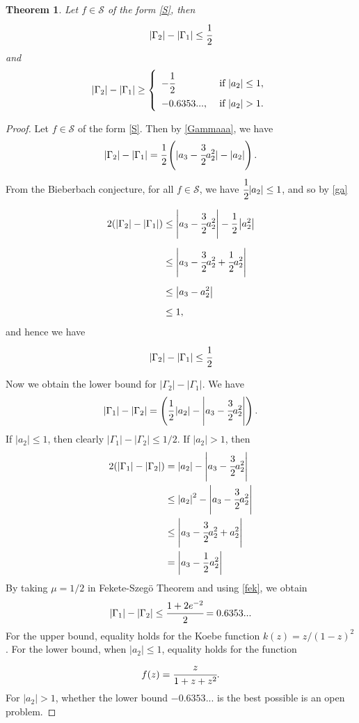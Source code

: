 \documentclass[10pt,a4paper]{amsart}
\newtheorem{theorem}{Theorem}
\begin{document}
 \begin{theorem}\label{classS}
 Let $f \in \mathcal{S}$ of the form \eqref{S}, then 
 $$
 |\Gamma_2|-|\Gamma_1| \leq \cfrac{1}{2}
 $$
 and 
 \begin{equation*}\label{BBB}
|\Gamma_2|-|\Gamma_1| \geq \left \{
	\begin{array}{ll}
		-\cfrac{1}{2} & {\mbox{ if }} |a_2|\leq 1,
		\\[3mm]
		-0.6353..., & {\mbox{ if }} |a_2|>1.
	\end{array}
	\right.
\end{equation*}
 \end{theorem}

 \begin{proof}
 Let $f \in \mathcal{S}$ of the form \eqref{S}. Then by \eqref{Gammaaa}, we have
\begin{equation}\label{ga}
|\Gamma_2|-|\Gamma_1|=\cfrac{1}{2}\left(|a_3-\cfrac{3}{2}a_2^2|-|a_2|\right).
\end{equation}
From the Bieberbach conjecture, for all $f \in \mathcal{S}$, we have $\cfrac{1}{2}|a_2| \leq 1$, and so by \eqref{ga}

\begin{equation}
\begin{aligned}
2(|\Gamma_2|-|\Gamma_1|)&\leq \left|a_3-\cfrac{3}{2}a_2^2\right|-\cfrac{1}{2}\left|a_2^2\right|\\[2mm]
&\leq \left| a_3-\cfrac{3}{2}a_2^2+\cfrac{1}{2}a_2^2 \right| \\[2mm]
&\leq \left| a_3-a_2^2\right|\\[2mm]
&\leq 1,
\end{aligned}
\end{equation}
and hence we have
$$
|\Gamma_2|-|\Gamma_1| \leq \cfrac{1}{2}
$$

\noindent Now we obtain the lower bound for $|\Gamma_2|-|\Gamma_1|$.
We have 
$$
|\Gamma_1|-|\Gamma_2| = \left(\cfrac{1}{2}\left|a_2\right|-\left|a_3-\cfrac{3}{2}a_2^2\right|\right).
$$
If $|a_2|\leq 1$, then clearly $|\Gamma_1|-|\Gamma_2| \leq 1/2$. If $|a_2|> 1$, then
\begin{equation}\label{fek}
\begin{aligned}
2(|\Gamma_1|-|\Gamma_2|) &= \left|a_2\right|-\left|a_3-\cfrac{3}{2}a_2^2\right|\\
&\leq \left|a_2\right|^2-\left|a_3-\cfrac{3}{2}a_2^2\right|\\
&\leq \left| a_3-\cfrac{3}{2}a_2^2+a_2^2\right|\\
&=\left| a_3-\frac{1}{2}a_2^2\right|
\end{aligned}
\end{equation}
By taking $\mu=1/2$ in Fekete-Szegö Theorem and using \eqref{fek}, we obtain 
$$
|\Gamma_1|-|\Gamma_2|\leq  \cfrac{1+2e^{-2}}{2}=0.6353...
$$
For the upper bound, equality holds for the Koebe function $k(z)=z/(1-z)^2$. For the lower bound, when $|a_2|\leq 1$, equality holds for the function
$$
f(z)=\cfrac{z}{1+z+z^2}.
$$
For $|a_2| > 1$, whether the lower bound $-0.6353...$ is
the best possible is an open problem.


 \end{proof}
\end{document}

